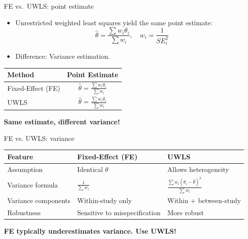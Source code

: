 \documentclass{beamer} %
\begin{document}
\begin{frame}{FE vs.\ UWLS: point estimate}

\begin{itemize}
    \item Unrestricted weighted least squares yield the same point estimate:
    \[
    \hat{\theta} = \frac{\sum w_i \theta_i}{\sum w_i}, \quad w_i = \frac{1}{SE_i^2}
    \]
    \item Difference: Variance estimation.
\end{itemize}

\bigskip

\begin{table}[]
    \centering
    \begin{tabular}{lc}
        \toprule
        \textbf{Method} & \textbf{Point Estimate} \\
        \midrule
        Fixed-Effect (FE) & \( \hat{\theta} = \frac{\sum w_i \theta_i}{\sum w_i} \) \\
        UWLS & \( \hat{\theta} = \frac{\sum w_i \theta_i}{\sum w_i} \) \\
        \bottomrule
    \end{tabular}
\end{table}

\bigskip

\textbf{Same estimate, different variance!}

\end{frame}

\begin{frame}{FE vs. UWLS: variance}

\renewcommand{\arraystretch}{1.2}  %
\begin{table}[]
    \centering
    \begin{tabular}{p{3cm} p{3cm} p{3cm}}  %
        \toprule
        \textbf{Feature} & \textbf{Fixed-Effect (FE)} & \textbf{UWLS} \\
        \midrule
        Assumption  & Identical \(\theta\) & Allows heterogeneity \\
        Variance formula  & \( \frac{1}{\sum w_i} \) & \( \frac{\sum w_i (\theta_i - \hat{\theta})^2}{\sum w_i} \) \\
        Variance components & Within-study only & Within + between-study \\
        Robustness & Sensitive to misspecification & More robust \\
        \bottomrule
    \end{tabular}
\end{table}

\bigskip

\textbf{FE typically underestimates variance. Use UWLS!}

\end{frame}
\end{document}
